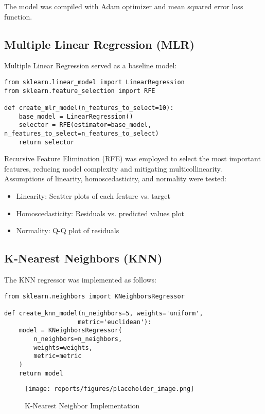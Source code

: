 \documentclass[12pt]{article}
\begin{document}
The model was compiled with Adam optimizer and mean squared error loss function.

\subsection{Multiple Linear Regression (MLR)}
\label{subsec:mlr}

Multiple Linear Regression served as a baseline model:

\begin{verbatim}
from sklearn.linear_model import LinearRegression
from sklearn.feature_selection import RFE

def create_mlr_model(n_features_to_select=10):
    base_model = LinearRegression()
    selector = RFE(estimator=base_model, n_features_to_select=n_features_to_select)
    return selector
\end{verbatim}

Recursive Feature Elimination (RFE) was employed to select the most important features, reducing model complexity and mitigating multicollinearity. Assumptions of linearity, homoscedasticity, and normality were tested:

\begin{itemize}
    \item Linearity: Scatter plots of each feature vs. target
    \item Homoscedasticity: Residuals vs. predicted values plot
    \item Normality: Q-Q plot of residuals
\end{itemize}

\subsection{K-Nearest Neighbors (KNN)}
\label{subsec:knn}

The KNN regressor was implemented as follows:

\begin{verbatim}
from sklearn.neighbors import KNeighborsRegressor

def create_knn_model(n_neighbors=5, weights='uniform', 
                    metric='euclidean'):
    model = KNeighborsRegressor(
        n_neighbors=n_neighbors,
        weights=weights,
        metric=metric
    )
    return model
\end{verbatim}

\begin{figure}[H]
    \centering
    \texttt{[image: reports/figures/placeholder\_image.png]} %
    \caption{K-Nearest Neighbor Implementation}
    \label{fig:3_4_knn_implementation}
\end{figure}
\end{document}
